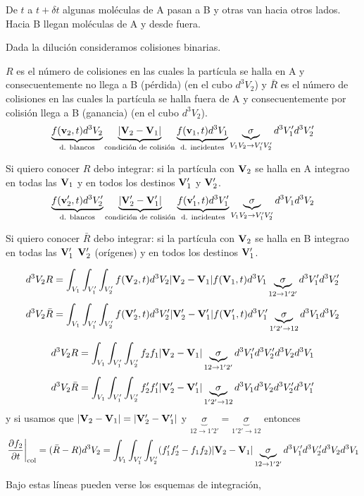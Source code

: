 \documentclass[10pt,oneside]{CBFT_book}
\begin{document}
De $t$ a $t+\delta t$ algunas moléculas de A pasan a B y otras van hacia otros lados. Hacia B
llegan moléculas de A y desde fuera.

Dada la dilución consideramos colisiones binarias.

$R$ es el número de colisiones en las cuales la partícula se halla en A y consecuentemente no llega 
a B (pérdida) (en el cubo $d^3V_2$) y $\bar{R}$ es el número de colisiones en las cuales la partícula
se halla fuera de A y consecuentemente por colisión llega a B (ganancia) (en el cubo $d^3V_2$).
\[
	\underbrace{ f( \vb{v}_2,t ) d^3V_2 }_{\text{d. blancos}}  
	\underbrace{| \vb{V}_2 - \vb{V}_1 |}_{ \text{condición de colisión} } 
	\underbrace{ f( \vb{v}_1,t ) d^3V_1 }_{\text{d. incidentes}}  
	\underbrace{\sigma}_{ V_1V_2 \to V_1'V_2'} d^3V_1' d^3V_2'
\]

Si quiero conocer $R$ debo integrar: si la partícula con $\vb{V}_2$ se halla en A integrao en todas
las $\vb{V}_1$ y en todos los destinos $\vb{V}_1'$ y $\vb{V}_2'$.
\[
	\underbrace{ f( \vb{v}_2',t ) d^3V_2' }_{\text{d. blancos}}  
	\underbrace{| \vb{V}_2' - \vb{V}_1' |}_{ \text{condición de colisión} } 
	\underbrace{ f( \vb{v}_1',t ) d^3V_1' }_{\text{d. incidentes}}  
	\underbrace{\sigma}_{ V_1V_2 \to V_1'V_2'} d^3V_1 d^3V_2
\]

Si quiero conocer $\bar{R}$ debo integrar: si la partícula con $\vb{V}_2$ se halla en B integrao en todas
las $\vb{V}_1'$ $\vb{V}_2'$ (orígenes) y en todos los destinos $\vb{V}_1'$.

\[
	d^3V_2 R = \int_{V_1} \int_{V_1'} \int_{V_2'}  f(\vb{V}_2,t) d^3V_2 | \vb{V}_2 - \vb{V}_1 |
		f(\vb{V}_1,t) d^3V_1 \underbrace{\sigma}_{12 \to 1'2'}  d^3V_1' d^3V_2'
\]
\[
	d^3V_2 \bar{R} = \int_{V_1} \int_{V_1'} \int_{V_2'}  f(\vb{V}_2',t) d^3V_2' | \vb{V}_2' - \vb{V}_1' |
		f(\vb{V}_1',t) d^3V_1' \underbrace{\sigma}_{1'2' \to 12}  d^3V_1 d^3V_2
\]

\[
	d^3V_2 R = \int_{V_1} \int_{V_1'} \int_{V_2'}  f_2 f_1  | \vb{V}_2 - \vb{V}_1 |
		\underbrace{\sigma}_{12 \to 1'2'}  d^3V_1' d^3V_2' d^3V_2 d^3V_1
\]
\[
	d^3V_2 \bar{R} = \int_{V_1} \int_{V_1'} \int_{V_2'}  f_2' f_1' | \vb{V}_2' - \vb{V}_1' |
		 \underbrace{\sigma}_{1'2' \to 12}  d^3V_1 d^3V_2 d^3V_2' d^3V_1'
\]
y si usamos que $| \vb{V}_2 - \vb{V}_1 |=| \vb{V}_2' - \vb{V}_1' |$ y $  \underbrace{\sigma}_{12 \to 1'2'} =  
\underbrace{\sigma}_{1'2' \to 12} $ entonces 
\[
	\left. \dpar{f_2}{t}\right|_{\text{col}} =(\bar{R}-R) d^3V_2 =
	\int_{V_1} \int_{V_1'} \int_{V_2'}  ( f_1' f_2' -f_1 f_2 ) | \vb{V}_2 - \vb{V}_1 |
		\underbrace{\sigma}_{12 \to 1'2'}  d^3V_1' d^3V_2' d^3V_2 d^3V_1
\]

Bajo estas líneas pueden verse los esquemas de integración,

\end{document}
